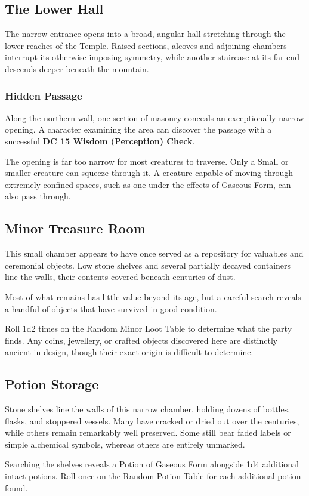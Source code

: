 \subsection*{ The Lower Hall}
{The narrow entrance opens into a broad, angular hall stretching through the lower reaches of the Temple. Raised sections, alcoves and adjoining chambers interrupt its otherwise imposing symmetry, while another staircase at its far end descends deeper beneath the mountain.}
\subsubsection*{Hidden Passage}
{\entryfont Along the northern wall, one section of masonry conceals an exceptionally narrow opening. A character examining the area can discover the passage with a successful \textbf{DC 15 Wisdom (Perception) Check}.

The opening is far too narrow for most creatures to traverse. Only a Small or smaller creature can squeeze through it. A creature capable of moving through extremely confined spaces, such as one under the effects of Gaseous Form, can also pass through.}

\subsection*{ Minor Treasure Room}
{\entryfont This small chamber appears to have once served as a repository for valuables and ceremonial objects. Low stone shelves and several partially decayed containers line the walls, their contents covered beneath centuries of dust.

Most of what remains has little value beyond its age, but a careful search reveals a handful of objects that have survived in good condition.

Roll 1d2 times on the Random Minor Loot Table to determine what the party finds. Any coins, jewellery, or crafted objects discovered here are distinctly ancient in design, though their exact origin is difficult to determine.}

\subsection*{ Potion Storage}
{\entryfont Stone shelves line the walls of this narrow chamber, holding dozens of bottles, flasks, and stoppered vessels. Many have cracked or dried out over the centuries, while others remain remarkably well preserved. Some still bear faded labels or simple alchemical symbols, whereas others are entirely unmarked.

Searching the shelves reveals a Potion of Gaseous Form alongside 1d4 additional intact potions. Roll once on the Random Potion Table for each additional potion found.}

